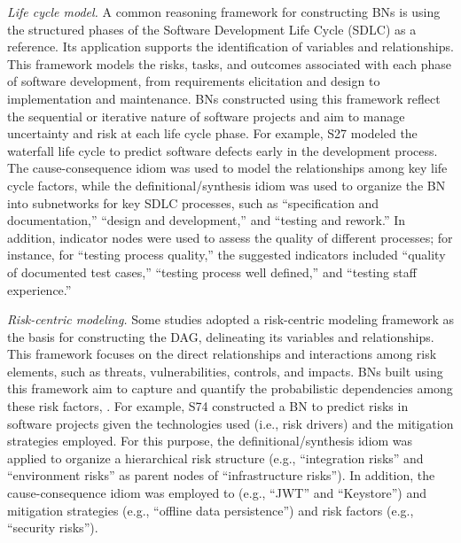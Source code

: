 \textit{Life cycle model.} A common reasoning framework for constructing BNs is using the structured phases of the Software Development Life Cycle (SDLC) as a reference. Its application supports the identification of variables and relationships. This framework models the risks, tasks, and outcomes associated with each phase of software development, from requirements elicitation and design to implementation and maintenance. BNs constructed using this framework reflect the sequential or iterative nature of software projects and aim to manage uncertainty and risk at each life cycle phase. For example, S27 modeled the waterfall life cycle to predict software defects early in the development process. The cause-consequence idiom was used to model the relationships among key life cycle factors, while the definitional/synthesis idiom was used to organize the BN into subnetworks for key SDLC processes, such as ``specification and documentation,'' ``design and development,'' and ``testing and rework.'' In addition, indicator nodes were used to assess the quality of different processes; for instance, for ``testing process quality,'' the suggested indicators included ``quality of documented test cases,'' ``testing process well defined,'' and ``testing staff experience.''

\textit{Risk-centric modeling.} Some studies adopted a risk-centric modeling framework as the basis for constructing the DAG, delineating its variables and relationships. This framework focuses on the direct relationships and interactions among risk elements, such as threats, vulnerabilities, controls, and impacts. BNs built using this framework aim to capture and quantify the probabilistic dependencies among these risk factors, . For example, S74 constructed a BN to predict risks in software projects given the technologies used (i.e., risk drivers) and the mitigation strategies employed. For this purpose, the definitional/synthesis idiom was applied to organize a hierarchical risk structure (e.g., ``integration risks'' and ``environment risks'' as parent nodes of ``infrastructure risks''). In addition, the cause-consequence idiom was employed to  (e.g., ``JWT'' and ``Keystore'') and mitigation strategies (e.g., ``offline data persistence'') and risk factors (e.g., ``security risks'').

